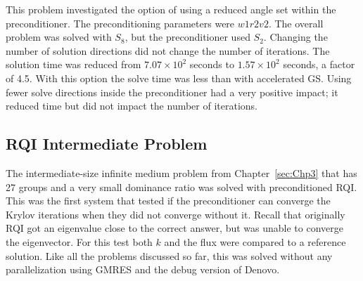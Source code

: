 This problem investigated the option of using a reduced angle set within the preconditioner. The preconditioning parameters were $w1r2v2$. The overall problem was solved with $S_{8}$, but the preconditioner used $S_{2}$. Changing the number of solution directions did not change the number of iterations. The solution time was reduced from $7.07 \times 10^{2}$ seconds to $1.57 \times 10^{2}$ seconds, a factor of 4.5. With this option the solve time was less than with accelerated GS. Using fewer solve directions inside the preconditioner had a very positive impact; it reduced time but did not impact the number of iterations.

\subsection{RQI Intermediate Problem}
The intermediate-size infinite medium problem from Chapter~\ref{sec:Chp3} that has 27 groups and a very small dominance ratio was solved with preconditioned RQI. This was the first system that tested if the preconditioner can converge the Krylov iterations when they did not converge without it. Recall that originally RQI got an eigenvalue close to the correct answer, but was unable to converge the eigenvector. For this test both $k$ and the flux were compared to a reference solution. Like all the problems discussed so far, this was solved without any parallelization using GMRES and the debug version of Denovo. 

